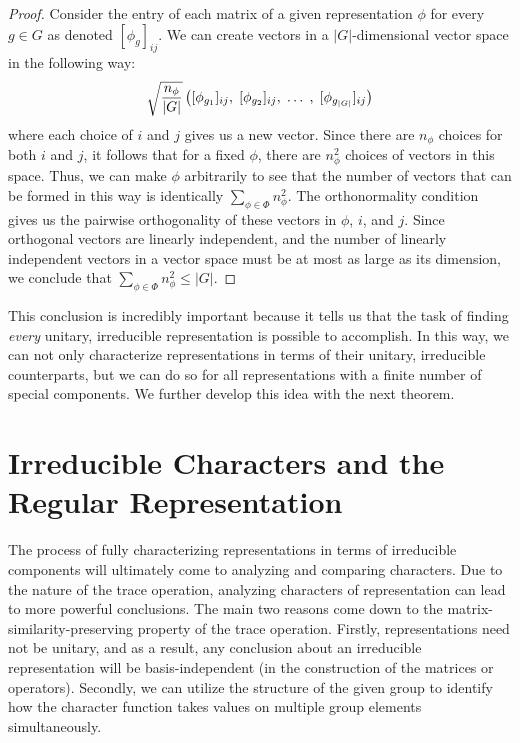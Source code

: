 \begin{proof}\cite{Tung}  Consider the entry of each matrix of a given representation $\phi$ for every $g \in G$ as denoted $[\phi_g]_{ij}$. We can create vectors in a $|G|$-dimensional vector space in the following way:
$$\sqrt{\frac{n_\phi}{|G|}}\left([\phi_{g_1}]_{ij},\hspace{1mm} [\phi_{g_2}]_{ij}, \hspace{1mm}\hdots \hspace{1mm},\hspace{1mm} [\phi_{g_{|G|}}]_{ij}\right)$$
where each choice of $i$ and $j$ gives us a new vector. Since there are $n_\phi$ choices for both $i$ and $j$, it follows that for a fixed $\phi$, there are $n_\phi^2$ choices of vectors in this space. Thus, we can make $\phi$ arbitrarily to see that the number of vectors that can be formed in this way is identically $\sum_{\phi \in \Phi}n^2_\phi$. The orthonormality condition gives us the pairwise orthogonality of these vectors in $\phi$, $i$, and $j$. Since orthogonal vectors are linearly independent, and the number of linearly independent vectors in a vector space must be at most as large as its dimension, we conclude that $\sum_{\phi \in \Phi}n^2_\phi \leq |G|$.  \end{proof}


This conclusion is incredibly important because it tells us that the task of finding \textit{every} unitary, irreducible representation is possible to accomplish. In this way, we can not only characterize representations in terms of their unitary, irreducible counterparts, but we can do so for all representations with a finite number of special components. We further develop this idea with the next theorem.


\section{Irreducible Characters and the Regular Representation}

The process of fully characterizing representations in terms of irreducible components will ultimately come to analyzing and comparing characters. Due to the nature of the trace operation, analyzing characters of representation can lead to more powerful conclusions. The main two reasons come down to the matrix-similarity-preserving property of the trace operation. Firstly, representations need not be unitary, and as a result, any conclusion about an irreducible representation will be basis-independent (in the construction of the matrices or operators). Secondly, we can utilize the structure of the given group to identify how the character function takes values on multiple group elements simultaneously. 

